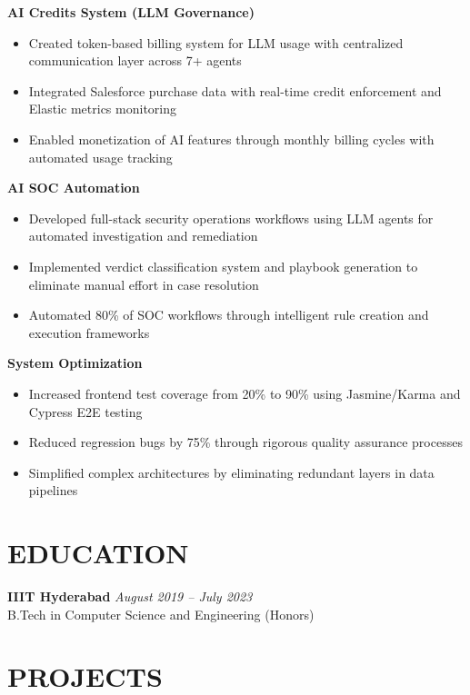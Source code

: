 \documentclass[letterpaper,11pt]{article}
\begin{document}
\textbf{AI Credits System (LLM Governance)}
\begin{itemize}
    \item Created token-based billing system for LLM usage with centralized communication layer across 7+ agents
    \item Integrated Salesforce purchase data with real-time credit enforcement and Elastic metrics monitoring
    \item Enabled monetization of AI features through monthly billing cycles with automated usage tracking
\end{itemize}

\textbf{AI SOC Automation}
\begin{itemize}
    \item Developed full-stack security operations workflows using LLM agents for automated investigation and remediation
    \item Implemented verdict classification system and playbook generation to eliminate manual effort in case resolution
    \item Automated 80\% of SOC workflows through intelligent rule creation and execution frameworks
\end{itemize}

\textbf{System Optimization}
\begin{itemize}
    \item Increased frontend test coverage from 20\% to 90\% using Jasmine/Karma and Cypress E2E testing
    \item Reduced regression bugs by 75\% through rigorous quality assurance processes
    \item Simplified complex architectures by eliminating redundant layers in data pipelines
\end{itemize}

\vspace{-6pt}

\section*{EDUCATION}

\textbf{IIIT Hyderabad} \hfill \textit{August 2019 -- July 2023} \\
B.Tech in Computer Science and Engineering (Honors)

\vspace{-6pt}

\section*{PROJECTS}
\end{document}
